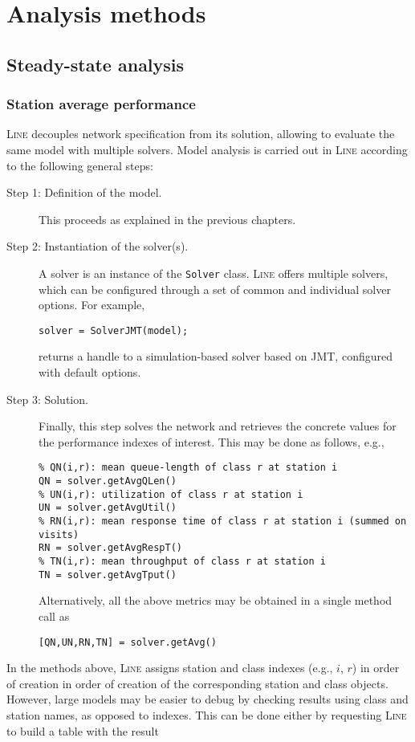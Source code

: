\chapter{Analysis methods}
\label{analysis-methods}

\section{Steady-state analysis}
\subsection{Station average performance}
\textsc{Line} decouples network specification from its solution, allowing to evaluate the same model with multiple solvers.
Model analysis is carried out in \textsc{Line} according to the following general steps:
\begin{description}
\item[Step 1: Definition of the model.] This proceeds as explained in the previous chapters.
\item[Step 2: Instantiation of the solver(s).] A solver is an instance of the \texttt{Solver} class. \textsc{Line} offers multiple solvers, which can be configured through a set of common and individual solver options. For example,
\begin{lstlisting}
solver = SolverJMT(model);
\end{lstlisting}
returns a handle to a simulation-based solver based on JMT, configured with default options.
\item[Step 3: Solution.] Finally, this step solves the network and retrieves the concrete values for the performance indexes of interest. This may be done as follows, e.g.,
\begin{lstlisting}
% QN(i,r): mean queue-length of class r at station i
QN = solver.getAvgQLen()
% UN(i,r): utilization of class r at station i
UN = solver.getAvgUtil()
% RN(i,r): mean response time of class r at station i (summed on visits)
RN = solver.getAvgRespT()
% TN(i,r): mean throughput of class r at station i
TN = solver.getAvgTput()
\end{lstlisting}
Alternatively, all the above metrics may be obtained in a single method call as
\begin{lstlisting}
[QN,UN,RN,TN] = solver.getAvg()
\end{lstlisting}
\end{description}
In the methods above, \textsc{Line} assigns station and class indexes (e.g., $i$, $r$) in order of creation in order of creation of the corresponding station and class objects. However, large models may be easier to debug by checking results using class and station names, as opposed to indexes. This can be done either by requesting \textsc{Line} to build a table with the result
